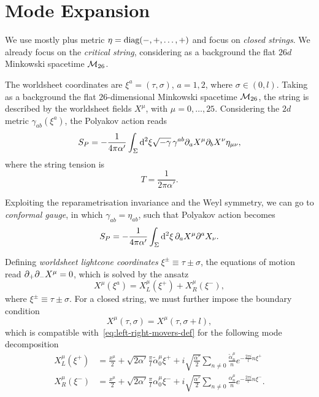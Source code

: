 \section{Mode Expansion}\label{sec:bosonic-mode-expansion}
We use mostly plus metric $\eta = \textup{diag}(-,+,\dots,+)$ and focus on \emph{closed strings}. We already focus on the \emph{critical string}, considering as a background the flat $26d$ Minkowski spacetime $\mathcal{M}_{26}$.

The worldsheet coordinates are $\xi^a = (\tau, \sigma)$, $a= 1,2$, where $\sigma \in (0,l)$. Taking as a background the flat $26$-dimensional Minkowski spacetime $\mathcal{M}_{26}$, the string is described by the worldsheet fields $X^{{\mu}}$, with ${\mu} = 0, \dots, 25$. Considering the $2d$ metric $\gamma_{ab}(\xi^a)$, the Polyakov action reads
\begin{equation}\label{eq:polyakov-action}
    S_P= -\frac{1}{4\pi\alpha'} \int_\Sigma \mathop{}\!\mathrm{d}^2 \xi \sqrt{-\gamma} \, \gamma^{ab} \partial_a X^{{\mu}} \partial_b X^{{\nu}} \eta_{{\mu}{\nu}} ,
\end{equation}
where the string tension is
\begin{equation}
    T = \frac{1}{2\pi\alpha'} .
\end{equation}

Exploiting the reparametrisation invariance and the Weyl symmetry, we can go to \emph{conformal gauge}, in which $\gamma_{ab} = \eta_{ab}$, such that Polyakov action becomes
\begin{equation}\label{eq:polyakov-conformal-gauge}
    S_P= -\frac{1}{4\pi\alpha'} \int_\Sigma \mathop{}\!\mathrm{d}^2 \xi \, \partial_a X^{{\mu}} \partial^a X_{{\nu}}  .
\end{equation}

Defining \emph{worldsheet lightcone coordinates} $\xi^\pm \equiv \tau \pm \sigma$, the equations of motion read $\partial_+\partial_- X^\mu = 0$, which is solved by the ansatz
\begin{equation}\label{eq:left-right-movers-def}
    X^{{\mu}}(\xi^a) = X^{{\mu}}_L(\xi^+) + X^{{\mu}}_R(\xi^-) ,
\end{equation}
where $\xi^\pm \equiv \tau \pm \sigma$. For a closed string, we must further impose the boundary condition
\begin{equation}\label{eq:boundary-condition}
    X^\mu (\tau,\sigma) = X^\mu (\tau, \sigma + l),
\end{equation}
which is compatible with~\eqref{eq:left-right-movers-def} for the following mode decomposition
\begin{subequations}\label{eq:mode-expansion}
\begin{align}
    X^\mu_L(\xi^+) &= \frac{x^\mu}{2} + \sqrt{2\alpha'} \frac{\pi}{l} \tilde{\alpha}^\mu_0 \xi^+ + i \sqrt{\frac{\alpha'}{2}} \sum_{n\neq 0} \frac{\tilde{\alpha}^\mu_n}{n}e^{-\frac{2\pi i}{l}n \xi^+} \\
    X^\mu_R(\xi^-) &= \frac{x^\mu}{2} + \sqrt{2\alpha'} \frac{\pi}{l} {\alpha}^\mu_0 \xi^- + i \sqrt{\frac{\alpha'}{2}} \sum_{n\neq 0} \frac{{\alpha}^\mu_n}{n}e^{-\frac{2\pi i}{l}n \xi^-} .
\end{align}
\end{subequations}

